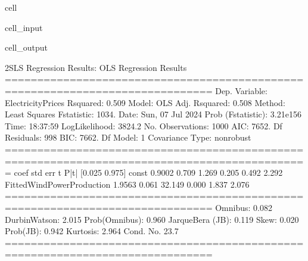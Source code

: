 \documentclass[letterpaper,10pt,english]{jupyterBook}
\begin{document}
\begin{sphinxuseclass}{cell}
\begin{sphinxVerbatimInput}
\begin{sphinxuseclass}{cell_input}
\end{sphinxuseclass}\end{sphinxVerbatimInput}
\begin{sphinxVerbatimOutput}

\begin{sphinxuseclass}{cell_output}
\begin{sphinxVerbatim}[commandchars=\\\{\}]
2SLS Regression Results:
                            OLS Regression Results                            
==============================================================================
Dep. Variable:      ElectricityPrices   R\PYGZhy{}squared:                       0.509
Model:                            OLS   Adj. R\PYGZhy{}squared:                  0.508
Method:                 Least Squares   F\PYGZhy{}statistic:                     1034.
Date:                Sun, 07 Jul 2024   Prob (F\PYGZhy{}statistic):          3.21e\PYGZhy{}156
Time:                        18:37:59   Log\PYGZhy{}Likelihood:                \PYGZhy{}3824.2
No. Observations:                1000   AIC:                             7652.
Df Residuals:                     998   BIC:                             7662.
Df Model:                           1                                         
Covariance Type:            nonrobust                                         
=============================================================================================
                                coef    std err          t      P\PYGZgt{}|t|      [0.025      0.975]
\PYGZhy{}\PYGZhy{}\PYGZhy{}\PYGZhy{}\PYGZhy{}\PYGZhy{}\PYGZhy{}\PYGZhy{}\PYGZhy{}\PYGZhy{}\PYGZhy{}\PYGZhy{}\PYGZhy{}\PYGZhy{}\PYGZhy{}\PYGZhy{}\PYGZhy{}\PYGZhy{}\PYGZhy{}\PYGZhy{}\PYGZhy{}\PYGZhy{}\PYGZhy{}\PYGZhy{}\PYGZhy{}\PYGZhy{}\PYGZhy{}\PYGZhy{}\PYGZhy{}\PYGZhy{}\PYGZhy{}\PYGZhy{}\PYGZhy{}\PYGZhy{}\PYGZhy{}\PYGZhy{}\PYGZhy{}\PYGZhy{}\PYGZhy{}\PYGZhy{}\PYGZhy{}\PYGZhy{}\PYGZhy{}\PYGZhy{}\PYGZhy{}\PYGZhy{}\PYGZhy{}\PYGZhy{}\PYGZhy{}\PYGZhy{}\PYGZhy{}\PYGZhy{}\PYGZhy{}\PYGZhy{}\PYGZhy{}\PYGZhy{}\PYGZhy{}\PYGZhy{}\PYGZhy{}\PYGZhy{}\PYGZhy{}\PYGZhy{}\PYGZhy{}\PYGZhy{}\PYGZhy{}\PYGZhy{}\PYGZhy{}\PYGZhy{}\PYGZhy{}\PYGZhy{}\PYGZhy{}\PYGZhy{}\PYGZhy{}\PYGZhy{}\PYGZhy{}\PYGZhy{}\PYGZhy{}\PYGZhy{}\PYGZhy{}\PYGZhy{}\PYGZhy{}\PYGZhy{}\PYGZhy{}\PYGZhy{}\PYGZhy{}\PYGZhy{}\PYGZhy{}\PYGZhy{}\PYGZhy{}\PYGZhy{}\PYGZhy{}\PYGZhy{}\PYGZhy{}
const                         0.9002      0.709      1.269      0.205      \PYGZhy{}0.492       2.292
FittedWindPowerProduction     1.9563      0.061     32.149      0.000       1.837       2.076
==============================================================================
Omnibus:                        0.082   Durbin\PYGZhy{}Watson:                   2.015
Prob(Omnibus):                  0.960   Jarque\PYGZhy{}Bera (JB):                0.119
Skew:                          \PYGZhy{}0.020   Prob(JB):                        0.942
Kurtosis:                       2.964   Cond. No.                         23.7
==============================================================================


\end{sphinxVerbatim}
\end{sphinxuseclass}
\end{sphinxVerbatimOutput}
\end{sphinxuseclass}
\end{document}
